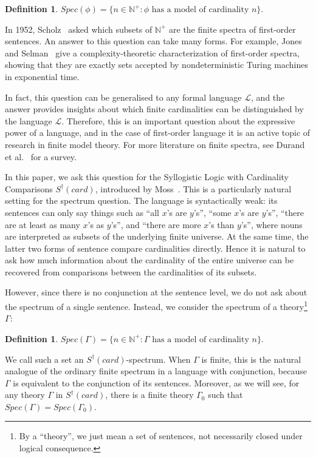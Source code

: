 \documentclass[12pt, reqno]{amsart}
\theoremstyle{definition}
\newtheorem{definition}[theorem]{Definition}
\theoremstyle{remark}
\numberwithin{equation}{section}
\begin{document}
\begin{definition}
	$Spec(\phi) = \{n\in\mathbb N^+ : \phi\text{ has a model of cardinality }n\}$. 
\end{definition}

In 1952, Scholz~\cite{Scholz1952} asked which subsets of $\mathbb N^+$ are the finite spectra of first-order sentences. An answer to this question can take many forms. For example, Jones and Selman~\cite{JonesSelman1974} give a complexity-theoretic characterization of first-order spectra, showing that they are exactly sets accepted by nondeterministic Turing machines in exponential time.

In fact, this question can be generalised to any formal language $\mathcal{L}$, and the answer provides insights about which finite cardinalities can be distinguished by the language $\mathcal{L}$. Therefore, this is an important question about the expressive power of a language, and in the case of first-order language it is an active topic of research in finite model theory. For more literature on finite spectra, see Durand et al.~\cite{SpectrumSurvey} for a survey.

In this paper, we ask this question for the Syllogistic Logic with
Cardinality Comparisons $S^\dagger(card)$, introduced by Moss~\cite{Larry}.
This is a particularly natural setting for the spectrum question. The
language is syntactically weak: its sentences can only say things such
as ``all $x$'s are $y$'s'', ``some $x$'s are $y$'s'', ``there are at
least as many $x$'s as $y$'s'', and ``there are more $x$'s than
$y$'s'', where nouns are interpreted as subsets of the underlying
finite universe. At the same time, the latter two forms of sentence
compare cardinalities directly. Hence it is natural to ask how much
information about the cardinality of the entire universe can be
recovered from comparisons between the cardinalities of its subsets.

However, since there is no conjunction at the sentence level, we do not ask about the spectrum of a single sentence. Instead, we consider the spectrum of a theory\footnote{By a ``theory'', we just mean a set of sentences, not necessarily closed under logical consequence.} $\Gamma$: 

\begin{definition}
	$Spec(\Gamma) = \{n\in\mathbb N^+ : \Gamma\text{ has a model of cardinality }n\}$.
\end{definition}

We call such a set an $S^{\dagger}(card)$-spectrum. When $\Gamma$ is finite, this is the natural analogue of the ordinary finite spectrum in a language with conjunction, because $\Gamma$ is equivalent to the conjunction of its sentences. Moreover, as we will see, for any theory $\Gamma$ in $S^{\dagger}(card)$, there is a finite theory $\Gamma_0$ such that $Spec(\Gamma) = Spec(\Gamma_0)$.  
\end{document}

